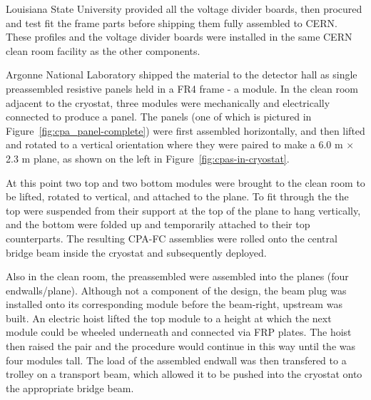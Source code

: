 Louisiana State University provided all the voltage divider boards, then procured and test fit the  frame parts before shipping them fully assembled to CERN.
These profiles and the voltage divider boards were installed in the same CERN clean room facility as the other  components.

Argonne National Laboratory shipped the  material to the detector hall as single preassembled resistive panels held in a FR4 frame - a  module. 
In the clean room adjacent to the  cryostat, three  modules were mechanically and electrically connected to produce a  panel. %
The  panels (one of which is pictured in Figure~\ref{fig:cpa_panel-complete}) were first assembled horizontally, and then lifted and rotated to a vertical orientation where they were paired to make a 6.0 m $\times$ 2.3 m  plane, as shown on the left in Figure~\ref{fig:cpas-in-cryostat}.

At this point two top and two bottom  modules were brought to the clean room to be lifted, rotated to vertical, and attached to the  plane. 
To fit through the  the top  were suspended from their support at the top of the  plane to hang vertically, and the bottom  were folded up and temporarily attached to their top  counterparts.
The resulting CPA-FC assemblies were rolled onto the central bridge beam inside the cryostat and subsequently deployed. 

Also in the  clean room, the preassembled  %
were assembled into the  planes (four endwalls/plane). %
Although not a component of the  design, 
the beam plug was installed onto its corresponding module %
before the beam-right, upstream  was built.
An electric hoist lifted the top %
module to a height at which the next %
module could be wheeled underneath and connected via FRP plates.
The hoist then raised the pair and the procedure would continue in this way until the  was four %
modules tall.
The load of the assembled endwall was then transfered to a trolley on a transport beam, which allowed it to be pushed into the cryostat onto the appropriate bridge beam.

